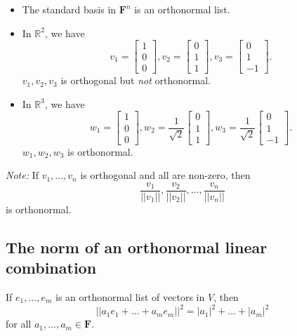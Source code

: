 \documentclass[11pt]{article}
\begin{document}
    \begin{itemize}
        \item The standard basis in \(\textbf{F}^n\) is an orthonormal list. 
        \item In \(\mathbb{R}^2\), we have \[v_1 = \begin{bmatrix}
            1 \\ 0 \\ 0
        \end{bmatrix}, v_2 = \begin{bmatrix}
            0 \\ 1 \\ 1
        \end{bmatrix}, v_3 = \begin{bmatrix}
            0 \\ 1 \\ -1
        \end{bmatrix}.\] \(v_1, v_2, v_3\) is orthogonal but \emph{not} orthonormal. 

        \item In \(\mathbb{R}^3\), we have \[w_1 = \begin{bmatrix}
            1 \\ 0 \\ 0
        \end{bmatrix}, w_2 = \frac{1}{\sqrt{2}} \begin{bmatrix}
            0 \\ 1 \\ 1
        \end{bmatrix}, w_3 = \frac{1}{\sqrt{2}} \begin{bmatrix}
            0 \\ 1 \\ -1
        \end{bmatrix}.\] \(w_1, w_2, w_3\) is orthonormal. 
    \end{itemize}

    \emph{Note:} If \(v_1, \dots, v_n\) is orthogonal and all are non-zero, then \[\frac{v_1}{||v_1||}, \frac{v_2}{||v_2||}, \dots, \frac{v_n}{||v_n||}\] is orthonormal. 

    \subsection{The norm of an orthonormal linear combination}

    If \(e_1, \dots, e_m\) is an orthonormal list of vectors in $V$, then \[||a_1 e_1 + \dots + a_m e_m ||^2 = |a_1 |^2 + \dots + |a_m|^2\] for all \(a_1, \dots, a_m \in \textbf{F}\). 
\end{document}
